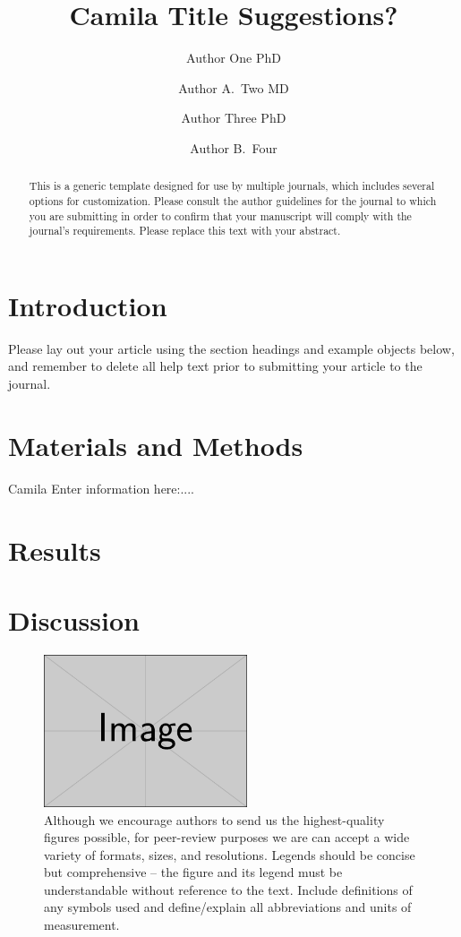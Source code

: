 \documentclass[alpha-refs]{wiley-article}
\title{Camila Title Suggestions?}
\author[1\authfn{1}]{Author One PhD}
\author[2\authfn{1}]{Author A.~Two MD}
\author[2\authfn{2}]{Author Three PhD}
\author[2]{Author B.~Four}
\affil[1]{Department, Institution, City, State or Province, Postal Code, Country}
\affil[2]{Department, Institution, City, State or Province, Postal Code, Country}
\begin{document}
\maketitle

\begin{abstract}
This is a generic template designed for use by multiple journals, which includes several options for customization. Please consult the author guidelines for the journal to which you are submitting in order to confirm that your manuscript will comply with the journal's requirements. Please replace this text with your abstract.

\end{abstract}

\section{Introduction}
Please lay out your article using the section headings and example objects below, and remember to delete all help text prior to submitting your article to the journal.


\section{Materials and Methods}

Camila Enter information here:....


\section{Results}

\section{Discussion}

\begin{figure}[bt]
\centering
\includegraphics[width=6cm]{example-image-rectangle}
\caption{Although we encourage authors to send us the highest-quality figures possible, for peer-review purposes we are can accept a wide variety of formats, sizes, and resolutions. Legends should be concise but comprehensive – the figure and its legend must be understandable without reference to the text. Include definitions of any symbols used and define/explain all abbreviations and units of measurement.}
\end{figure}
\end{document}

